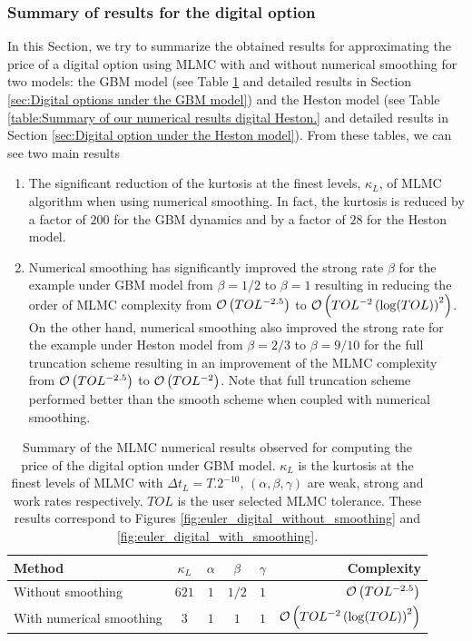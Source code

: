 \subsubsection{Summary of results for the digital option}\label{sec:Summary of results for the digital option}
In this Section, we try to summarize the obtained results for approximating the price of a digital option using MLMC with and without numerical smoothing for two models: the GBM model (see Table \ref{table:Summary of our numerical results digital GBM.} and  detailed results in Section \ref{sec:Digital options under the GBM model}) and the Heston model (see Table \ref{table:Summary of our numerical results digital Heston.} and  detailed results in Section \ref{sec:Digital option under the Heston model}). From these tables, we can see two main results
\begin{enumerate}
\item The significant reduction of the kurtosis at the finest levels, $\kappa_{L}$, of MLMC algorithm when using numerical smoothing. In fact, the kurtosis is reduced by a factor of $200$ for the GBM dynamics and by a factor of $28$  for the Heston model.
\item Numerical smoothing has significantly improved the strong rate $\beta$ for the example under GBM model from $\beta=1/2$ to $\beta=1$ resulting in reducing the order of MLMC complexity from ${\mathcal{O}}\left(TOL^{-2.5}\right)$ to ${\mathcal{O}}\left(TOL^{-2} \left(\log(TOL)\right)^2\right)$. On the other hand, numerical smoothing also improved  the strong rate for  the example under Heston model from $\beta=2/3$ to $\beta=9/10$ for the full truncation scheme resulting in an improvement of the MLMC complexity from  ${\mathcal{O}}\left(TOL^{-2.5}\right)$ to ${\mathcal{O}}\left(TOL^{-2}\right)$. Note that full truncation scheme performed better than the smooth scheme when coupled with numerical smoothing.
\end{enumerate}

\FloatBarrier
\begin{table}[!h]
	\centering
	\begin{small}
	\begin{tabular}{l*{4}{c}r}
	\toprule[1.5pt]
		Method      &   $\kappa_{L}$  & $\alpha$  & $\beta$  &  $\gamma$   & Complexity \\
		\hline
			Without smoothing & $621$& $1$ & $1/2$ & $1$&  ${\mathcal{O}}\left(TOL^{-2.5}\right)$ \\	
              \hline
           With numerical smoothing   & $3$& $1$ & $1$ & $1$&  ${\mathcal{O}}\left(TOL^{-2} \left(\log(TOL)\right)^2\right)$ \\
		\bottomrule[1.25pt]
	\end{tabular}
\end{small}
	\caption{Summary of the MLMC numerical results observed for  computing the price of the digital option under GBM model. $\kappa_{L}$ is the kurtosis at the finest levels of MLMC with $\Delta t_{L}=T.2^{-10}$, $(\alpha,\beta,\gamma)$ are weak, strong and work rates respectively. $TOL$ is the user selected  MLMC  tolerance. These results correspond to Figures \ref{fig:euler_digital_without_smoothing} and \ref{fig:euler_digital_with_smoothing}.}
	\label{table:Summary of our numerical results digital GBM.}
\end{table}
\FloatBarrier

